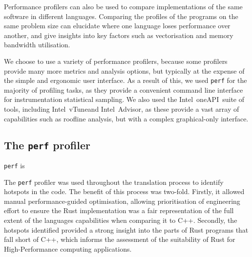 Performance profilers can also be used to compare implementations of the same software in different languages. Comparing the  profiles of the programs on the same problem size can elucidate where one language loses performance over another, and give insights into key factors such as vectorisation and memory bandwidth utilisation.

We choose to use a variety of performance profilers, because some profilers provide many more metrics and analysis options, but typically at the expense of the simple and ergonomic user interface. As a result of this, we used \texttt{perf} for the majority of profiling tasks, as they provide a convenient command line interface for instrumentation statistical sampling. We also used the Intel\textregistered\ oneAPI\texttrademark\ suite of tools, including Intel\textregistered\ vTune\texttrademark and Intel\textregistered\ Advisor\texttrademark, as these provide a vast array of capabilities such as roofline analysis, but with a complex graphical-only interface.


\subsection{The \texttt{perf} profiler}
\label{ssec:perf profiler}

\texttt{perf} is 

The \texttt{perf} profiler was used throughout the translation process to identify hotspots in the code. The benefit of this process was two-fold. Firstly, it allowed manual performance-guided optimisation, allowing prioritisation of engineering effort to ensure the Rust implementation was a fair representation of the full extent of the languages capabilities when comparing it to C++. Secondly, the hotspots identified provided a strong insight into the parts of Rust programs that fall short of C++, which informs the assessment of the suitability of Rust for High-Performance computing applications.

